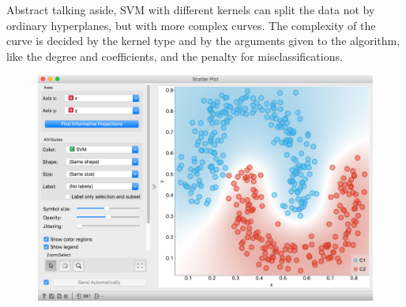 Abstract talking aside, SVM with different kernels can split the data not by ordinary hyperplanes, but with more complex curves. The complexity of the curve is decided by the kernel type and by the arguments given to the algorithm, like the degree and coefficients, and the penalty for misclassifications.

\begin{figure}[h]
    \centering
    \vspace{-0.2cm}
    \includegraphics[scale=0.35]{svm-orange.png}
\end{figure}

